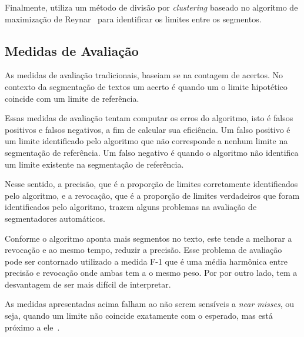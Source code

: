 	
Finalmente, utiliza um método de divisão por \textit{clustering} baseado no algoritmo de maximização de Reynar~\cite{Reynar1998} para identificar os limites entre os segmentos. %




\subsection{Medidas de Avaliação}


As medidas de avaliação tradicionais, baseiam se na contagem de acertos. No contexto da segmentação de textos um acerto é quando um o limite hipotético coincide com um limite de referência.

Essas medidas de avaliação tentam computar os erros do algoritmo, isto é falsos positivos e falsos negativos, a fim de calcular sua eficiência. 
%
Um falso positivo é um limite identificado pelo algoritmo que não corresponde a nenhum limite na segmentação de referência. 
%
Um falso negativo é quando o algoritmo não identifica um limite existente na segmentação de referência.


Nesse sentido, 
%
a precisão, que é a proporção de limites corretamente identificados pelo algoritmo, e 
%
a revocação, que é a proporção de limites verdadeiros que foram identificados pelo algoritmo,
%
trazem alguns problemas na avaliação de segmentadores automáticos.
 	
	
Conforme o algoritmo aponta mais segmentos no texto, este tende a melhorar a revocação e ao mesmo tempo, reduzir a precisão. Esse problema de avaliação pode ser contornado utilizado a medida F-1 que é uma média harmônica entre precisão e revocação onde ambas tem a o mesmo peso. Por por outro lado, tem a desvantagem de ser mais difícil de interpretar. 

As medidas apresentadas acima falham ao não serem sensíveis a \textit{near misses}, ou seja, quando um limite não coincide exatamente com o esperado, mas está próximo a ele~\cite{Kern2009}.

